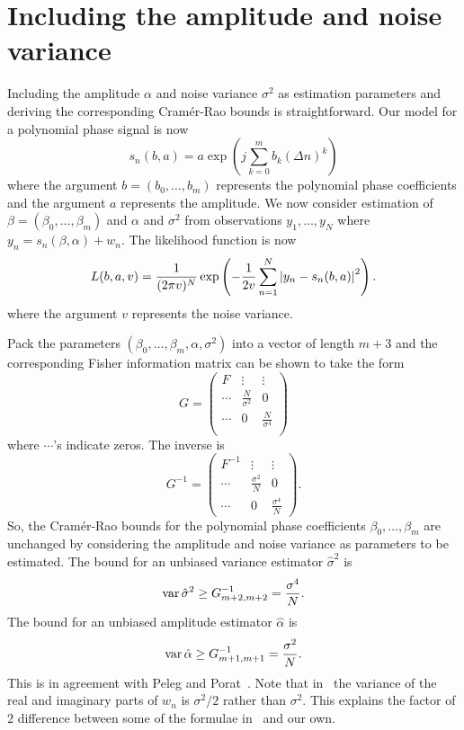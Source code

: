 \documentclass[5p]{elsarticle}
\begin{document}
\section{Including the amplitude and noise variance}\label{sec:including-amplitude}

Including the amplitude $\alpha$ and noise variance $\sigma^2$ as estimation parameters and deriving the corresponding Cram\'{e}r-Rao bounds is straightforward.  Our model for a polynomial phase signal is now
\[
s_n(b,a) = a \exp\left( j \sum_{k = 0}^{m}{b_k (\Delta n)^k}\right)
\]
where the argument $b=(b_0, \dots, b_m)$ represents the polynomial phase coefficients and the argument $a$ represents the amplitude.  We now consider estimation of $\beta = (\beta_0, \dots, \beta_m)$ and $\alpha$ and $\sigma^2$  from observations $y_1, \dots, y_N$ where $y_n = s_n(\beta,\alpha) + w_n$.  The likelihood function is now
\[
L(b,a,v) = \frac{1}{(2 \pi v )^N} \exp\left( - \frac{1}{2 v } \sum_{n=1}^N {\left| y_n -  s_n(b,a)  \right|}^2 \right).
\]
where the argument $v$ represents the noise variance.

Pack the parameters $(\beta_0, \dots, \beta_m,\alpha,\sigma^2)$ into a vector of length $m+3$ and the corresponding Fisher information matrix can be shown to take the form
\[
G = \left( \begin{array}{ccc}
F & \vdots & \vdots \\
\cdots & \frac{N}{\sigma^2} & 0\\
\cdots & 0 & \frac{N}{\sigma^4} \\
\end{array}\right)
\]
where $\cdots$'s indicate zeros.  The inverse is
\[
G^{-1} = \left( \begin{array}{ccc}
F^{-1} & \vdots & \vdots \\
\cdots & \frac{\sigma^2}{N} & 0 \\
\cdots & 0 & \frac{\sigma^4}{N}
\end{array} \right).
\]
So, the Cram\'{e}r-Rao bounds for the polynomial phase coefficients $\beta_0, \dots, \beta_m$ are unchanged by considering the amplitude and noise variance as parameters to be estimated.  The bound for an unbiased variance estimator $\hat{\sigma}^2$ is
\[
\operatorname{var} \hat{\sigma}^2 \geq G_{m+2,m+2}^{-1} = \frac{\sigma^4}{N}.
\]
The bound for an unbiased amplitude estimator $\hat{\alpha}$ is
\[
\operatorname{var} \hat{\alpha} \geq G_{m+1,m+1}^{-1} = \frac{\sigma^2}{N}.
\]
This is in agreement with Peleg and Porat~\cite{Peleg1991_CRB_PPS_1991}.  Note that in~\cite{Peleg1991_CRB_PPS_1991} the variance of the real and imaginary parts of $w_n$ is $\sigma^2/2$ rather than $\sigma^2$.  This explains the factor of $2$ difference between some of the formulae in~\cite{Peleg1991_CRB_PPS_1991} and our own.
\end{document}
